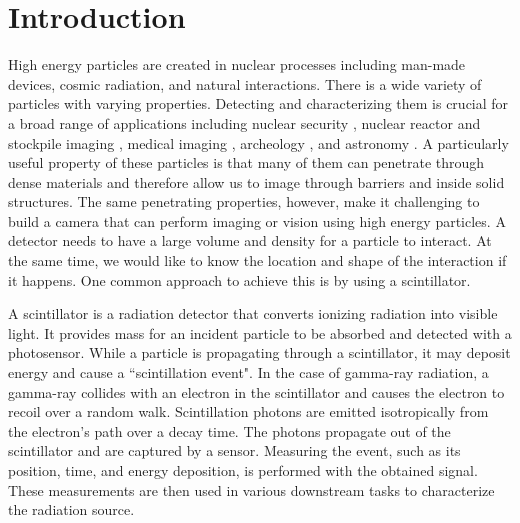 \section{Introduction}

High energy particles are created in nuclear processes including man-made 
devices, cosmic radiation, and natural interactions. 
There is a wide variety of particles with varying properties. 
Detecting and characterizing them is crucial for a broad range of applications 
including nuclear security \cite{vetter2018gamma}, nuclear reactor and stockpile imaging \cite{beaumont2015high}, 
medical imaging \cite{gonzalez2021evolution}, 
archeology \cite{menichelli2007scintillating,ryzewski2013neutron}, 
and astronomy \cite{schonfelder1984imaging}. 
A particularly useful property of these particles is that many of them can 
penetrate through dense materials and therefore allow us to image through 
barriers and inside solid structures. 
The same penetrating properties, however, make it challenging to build a camera 
that can perform imaging or vision using high energy particles. 
A detector needs to have a large volume and density for a particle to interact. 
At the same time, we would like to know the location and shape of the interaction if it happens. 
One common approach to achieve this is by using a scintillator.

A scintillator is a radiation detector that converts ionizing radiation into 
visible light.
It provides mass for an incident particle to be absorbed and detected with a photosensor.
While a particle is propagating through a scintillator, it may deposit energy and 
cause a ``scintillation event". 
In the case of gamma-ray radiation, a gamma-ray collides with an electron in the 
scintillator and causes the electron to recoil over a random walk.
Scintillation photons are emitted isotropically from the electron's path over a 
decay time.
The photons propagate out of the scintillator and are captured by a sensor.
Measuring the event, such as its position, time, and energy deposition, is 
performed with the obtained signal.
These measurements are then used in various downstream tasks to characterize 
the radiation source.

